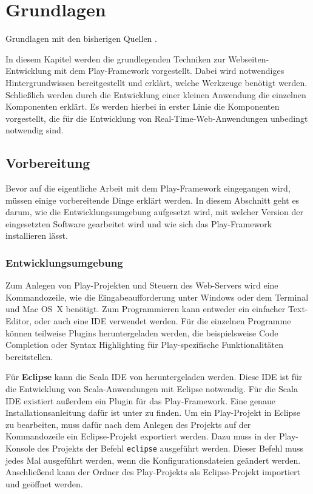 
\chapter{Grundlagen} %
\label{cha:grundlagen}

Grundlagen mit den bisherigen Quellen \citealt{play_for_scala_v8}.

In diesem Kapitel werden die grundlegenden Techniken zur Webseiten-Entwicklung mit dem Play-Framework vorgestellt.
Dabei wird notwendiges Hintergrundwissen bereitgestellt und erklärt, welche Werkzeuge benötigt werden.
Schließlich werden durch die Entwicklung einer kleinen Anwendung die einzelnen Komponenten erklärt.
Es werden hierbei in erster Linie die Komponenten vorgestellt, die für die Entwicklung von Real-Time-Web-Anwendungen unbedingt notwendig sind.


\section{Vorbereitung} %
\label{sec:vorbereitung}

Bevor auf die eigentliche Arbeit mit dem Play-Framework eingegangen wird, müssen einige vorbereitende Dinge erklärt werden.
In diesem Abschnitt geht es darum, wie die Entwicklungsumgebung aufgesetzt wird, mit welcher Version der eingesetzten Software gearbeitet wird und wie sich das Play-Framework installieren lässt.

\subsection{Entwicklungsumgebung} %
\label{sub:entwicklungsumgebung}

Zum Anlegen von Play-Projekten und Steuern des Web-Servers wird eine Kommandozeile, wie die Eingabeaufforderung unter Windows oder dem Terminal und Mac OS~X benötigt.
Zum Programmieren kann entweder ein einfacher Text-Editor, oder auch eine IDE verwendet werden.
Für die einzelnen Programme können teilweise Plugins heruntergeladen werden, die beispielsweise Code Completion oder Syntax Highlighting für Play-spezifische Funktionalitäten bereitstellen.

Für \textbf{Eclipse} kann die Scala IDE von \citealt{scala_ide} heruntergeladen werden.
Diese IDE ist für die Entwicklung von Scala-Anwendungen mit Eclipse notwendig.
Für die Scala IDE existiert außerdem ein Plugin für das Play-Framework.
Eine genaue Installationsanleitung dafür ist unter \citealt{scala_ide_play_plugin} zu finden.
Um ein Play-Projekt in Eclipse zu bearbeiten, muss dafür nach dem Anlegen des Projekts auf der Kommandozeile ein Eclipse-Projekt exportiert werden.
Dazu muss in der Play-Konsole des Projekts der Befehl \lstinline|eclipse| ausgeführt werden.
Dieser Befehl muss jedes Mal ausgeführt werden, wenn die Konfigurationsdateien geändert werden.
Anschließend kann der Ordner des Play-Projekts als Eclipse-Projekt importiert und geöffnet werden.

